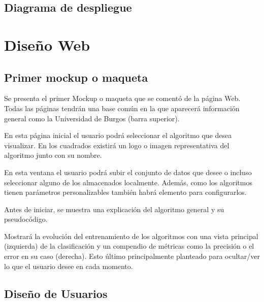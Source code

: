 \subsection{Diagrama de despliegue}


\section{Diseño Web}

\subsection{Primer mockup o maqueta}
Se presenta el primer Mockup o maqueta que se comentó de la página Web. Todas
las páginas tendrán una base común en la que aparecerá información general como
la Universidad de Burgos (barra superior).


En esta página inicial el usuario podrá seleccionar el algoritmo que desea
visualizar. En los cuadrados existirá un logo o imagen representativa del
algoritmo junto con su nombre.


En esta ventana el usuario podrá subir el conjunto de datos que desee o incluso
seleccionar alguno de los almacenados localmente. Además, como los algoritmos
tienen parámetros personalizables también habrá elemento para configurarlos.

Antes de iniciar, se muestra una explicación del algoritmo general y su
pseudocódigo.



Mostrará la evolución del entrenamiento de los algoritmos con una vista
principal (izquierda) de la clasificación y un compendio de métricas como la
precisión o el error en su caso (derecha). Esto último principalmente planteado
para ocultar/ver lo que el usuario desee en cada momento.

\subsection{Diseño de Usuarios}


